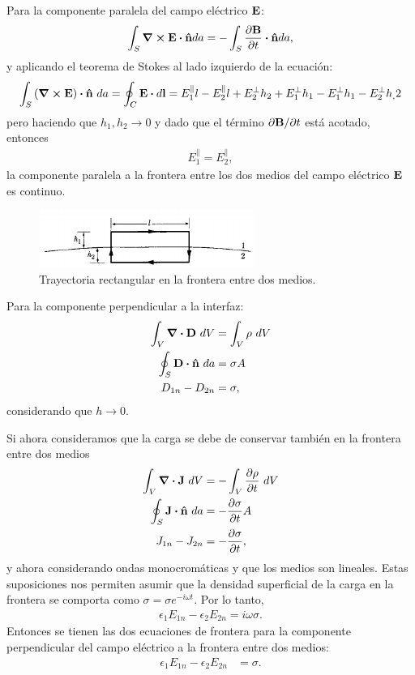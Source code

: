 Para la componente paralela del campo eléctrico $\vb{E}$:
\begin{align}
\int _S\curl{\vb{E}}\vdot \uv{n} da=
-\int_S \pdv{\vb{B}}{t}\vdot \uv{n}da,
\end{align}
y aplicando el teorema de Stokes al lado izquierdo de la ecuación:
\begin{align}
\int _S\qty(\curl{\vb{E}})\vdot \uv{n}\ da=
\oint_C \vb{E}\vdot d\vb{l} =
E_1^{\parallel}l-E_2^{\parallel}l+E_2^{\perp}h_2
+E_1^{\perp}h_1-E_1^{\perp}h_1-E_2^{\perp}h_,2
\end{align}
pero haciendo que $h_1,h_2\to 0$ y dado que el término 
$\partial \vb{B}/\partial t$ está acotado, entonces 
\begin{align}
E_1^{\parallel}=E_2^{\parallel},
\end{align}
la componente paralela a la frontera entre los dos medios del campo
eléctrico $\vb{E}$ es continuo. 
\begin{figure}
  \centering
  \includegraphics[width=7cm]{images/boundary-cond-E-parallel.png}
  \caption{Trayectoria rectangular en la frontera entre dos medios.}
  \label{fig:boundary-cond-E-parallel}
\end{figure}

Para la componente perpendicular a la interfaz:
\begin{align}
\int_V\div{\vb{D}}\ dV &= \int_V\rho\ dV\\
\oint_S\vb{D}\vdot \uv{n}\ da &= \sigma A\\
D_{1n}-D_{2n}&=\sigma, \label{eq:almost-bound-En}
\end{align}
considerando que $h\to0$.

Si ahora consideramos que la carga se debe de conservar también en la
frontera entre dos medios
\begin{align}
\int_V\div{\vb{J}}\ dV &= -\int_V\pdv{\rho}{t}\ dV\\
\oint_S\vb{J}\vdot \uv{n}\ da &= -\pdv{\sigma}{t} A\\
J_{1n}-J_{2n}&=-\pdv{\sigma}{t},
\end{align}
y ahora considerando ondas monocromáticas y que los 
medios son lineales. Estas suposiciones nos permiten asumir que 
la densidad superficial de la carga en la frontera se comporta como
$\sigma=\sigma e^{-i\omega t}$. Por lo tanto,
\begin{align}
\epsilon_1E_{1n}-\epsilon_2E_{2n}=i\omega \sigma.
\end{align}
Entonces se tienen las dos ecuaciones de frontera para la componente
perpendicular del campo eléctrico a la frontera entre dos medios:
\begin{align}
\epsilon_1 E	_{1n}-\epsilon_2E_{2n}&=\sigma.
\end{align}

